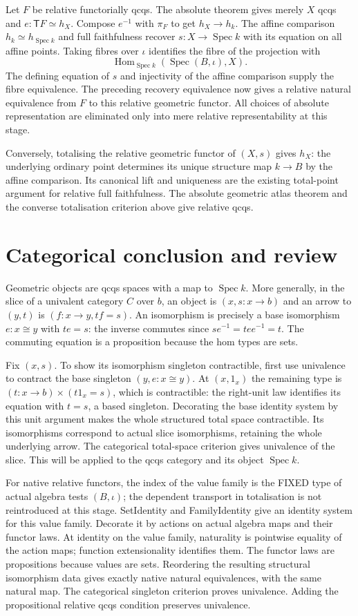 \documentclass[11pt]{amsart}
\theoremstyle{definition}\newtheorem{definition}[theorem]{Definition}
\newcommand{\Hom}{\operatorname{Hom}}
\newcommand{\Spec}{\operatorname{Spec}}
\begin{document}
Let $F$ be relative functorially qcqs. The absolute theorem gives merely
$X$ qcqs and $e:\mathsf T F\simeq h_X$. Compose $e^{-1}$ with $\pi_F$
to get $h_X\to h_k$. The affine comparison $h_k\simeq h_{\Spec k}$
and full faithfulness recover $s:X\to\Spec k$ with its equation on
all affine points. Taking fibres over $\iota$ identifies the fibre of
the projection with
\[
 \Hom_{\Spec k}(\Spec(B,\iota),X).
\]
The defining equation of $s$ and injectivity of the affine comparison
supply the fibre equivalence. The preceding recovery equivalence now
gives a relative natural equivalence from $F$ to this relative geometric
functor. All choices of absolute representation are eliminated only into
mere relative representability at this stage.

Conversely, totalising the relative geometric functor of $(X,s)$ gives
$h_X$: the underlying ordinary point determines its unique structure map
$k\to B$ by the affine comparison. Its canonical lift and uniqueness
are the existing total-point argument for relative full faithfulness.
The absolute geometric atlas theorem and the converse totalisation
criterion above give relative qcqs.

\section{Categorical conclusion and review}
Geometric objects are qcqs spaces with a map to $\Spec k$.
More generally, in the slice of a univalent category $C$ over $b$, an
object is $(x,s:x\to b)$ and an arrow to $(y,t)$ is $(f:x\to y,t f=s)$.
An isomorphism is precisely a base isomorphism $e:x\cong y$ with $te=s$:
the inverse commutes since $s e^{-1}=t e e^{-1}=t$. The commuting
equation is a proposition because the hom types are sets.

Fix $(x,s)$. To show its isomorphism singleton contractible, first use
univalence to contract the base singleton $(y,e:x\cong y)$.
At $(x,1_x)$ the remaining type is $(t:x\to b)\times(t1_x=s)$,
which is contractible: the right-unit law identifies its equation with
$t=s$, a based singleton. Decorating the base identity system by this
unit argument makes the whole structured total space contractible.
Its isomorphisms correspond to actual slice isomorphisms, retaining
the whole underlying arrow. The categorical total-space criterion gives
univalence of the slice. This will be applied to the qcqs category and
its object $\Spec k$.

For native relative functors, the index of the value family is the
FIXED type of actual algebra tests $(B,\iota)$; the dependent transport
in totalisation is not reintroduced at this stage. SetIdentity and
FamilyIdentity give an identity system for this value family. Decorate
it by actions on actual algebra maps and their functor laws. At identity
on the value family, naturality is pointwise equality of the action
maps; function extensionality identifies them. The functor laws are
propositions because values are sets. Reordering the resulting
structural isomorphism data gives exactly native natural equivalences,
with the same natural map. The categorical singleton criterion proves
univalence. Adding the propositional relative qcqs condition preserves
univalence.
\end{document}
